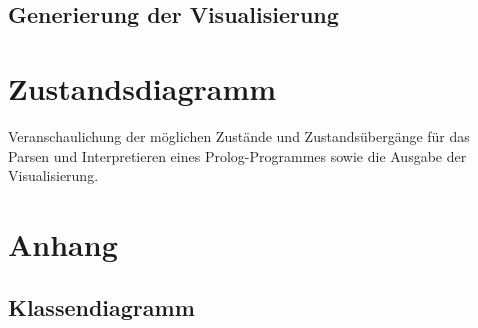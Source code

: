 \documentclass[parskip=full,11pt,twoside]{scrartcl}
\begin{document}
\subsection{Generierung der Visualisierung}

\section{Zustandsdiagramm}

Veranschaulichung der möglichen Zustände und Zustandsübergänge für das Parsen und Interpretieren eines Prolog-Programmes sowie die Ausgabe der Visualisierung.

\appendix

\section{Anhang}

\subsection{Klassendiagramm}
\end{document}
